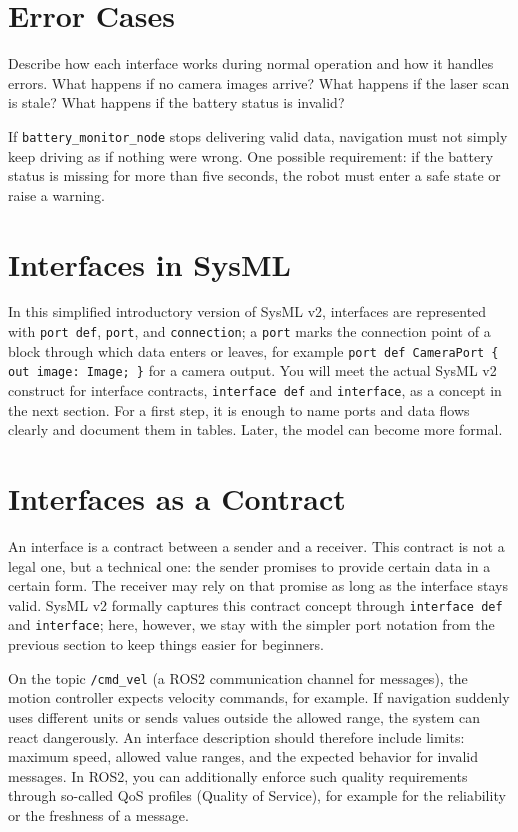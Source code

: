 \section{Error Cases}
Describe how each interface works during normal operation and how it handles errors. What happens if no camera images arrive? What happens if the laser scan is stale? What happens if the battery status is invalid?

\begin{praxisbox}
If \texttt{battery\_monitor\_node} stops delivering valid data, navigation must not simply keep driving as if nothing were wrong. One possible requirement: if the battery status is missing for more than five seconds, the robot must enter a safe state or raise a warning.
\end{praxisbox}

\section{Interfaces in SysML}
In this simplified introductory version of SysML v2, interfaces are represented with \texttt{port def}, \texttt{port}, and \texttt{connection}; a \texttt{port} marks the connection point of a block through which data enters or leaves, for example \texttt{port def CameraPort \{ out image: Image; \}} for a camera output. You will meet the actual SysML v2 construct for interface contracts, \texttt{interface def} and \texttt{interface}, as a concept in the next section. For a first step, it is enough to name ports and data flows clearly and document them in tables. Later, the model can become more formal.

\section{Interfaces as a Contract}
An interface is a contract between a sender and a receiver. This contract is not a legal one, but a technical one: the sender promises to provide certain data in a certain form. The receiver may rely on that promise as long as the interface stays valid. SysML v2 formally captures this contract concept through \texttt{interface def} and \texttt{interface}; here, however, we stay with the simpler port notation from the previous section to keep things easier for beginners.

On the topic \texttt{/cmd\_vel} (a ROS2 communication channel for messages), the motion controller expects velocity commands, for example. If navigation suddenly uses different units or sends values outside the allowed range, the system can react dangerously. An interface description should therefore include limits: maximum speed, allowed value ranges, and the expected behavior for invalid messages. In ROS2, you can additionally enforce such quality requirements through so-called QoS profiles (Quality of Service), for example for the reliability or the freshness of a message.

